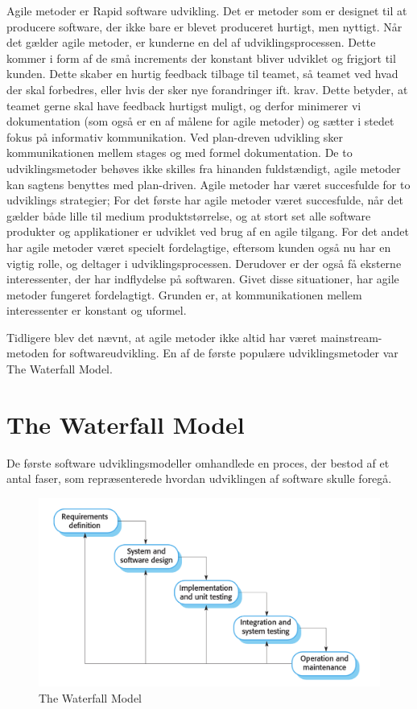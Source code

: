 Agile metoder er Rapid software udvikling. Det er metoder som er designet til at producere software, der ikke bare er blevet produceret hurtigt, men nyttigt\cite{Sommerville}. Når det gælder agile metoder, er kunderne en del af udviklingsprocessen. Dette kommer i form af de små increments der konstant bliver udviklet og frigjort til kunden. Dette skaber en hurtig feedback tilbage til teamet, så teamet ved hvad der skal forbedres, eller hvis der sker nye forandringer ift. krav. Dette betyder, at teamet gerne skal have feedback hurtigst muligt, og derfor minimerer vi dokumentation (som også er en af målene for agile metoder) og sætter i stedet fokus på informativ kommunikation. Ved plan-dreven udvikling sker kommunikationen mellem stages og med formel dokumentation. De to udviklingsmetoder behøves ikke skilles fra hinanden fuldstændigt, agile metoder kan sagtens benyttes med plan-driven. Agile metoder har været succesfulde for to udviklings strategier;
For det første har agile metoder været succesfulde, når det gælder både lille til medium produktstørrelse, og at stort set alle software produkter og applikationer er udviklet ved brug af en agile tilgang.
For det andet har agile metoder været specielt fordelagtige, eftersom kunden også nu har en vigtig rolle, og deltager i udviklingsprocessen. Derudover er der også få eksterne interessenter, der har indflydelse på softwaren\cite{Sommerville}. 
Givet disse situationer, har agile metoder fungeret fordelagtigt. Grunden er, at kommunikationen mellem interessenter er konstant og uformel.

Tidligere blev det nævnt, at agile metoder ikke altid har været mainstream-metoden for softwareudvikling. En af de første populære udviklingsmetoder var The Waterfall Model.

\section{The Waterfall Model}
De første software udviklingsmodeller omhandlede en proces, der bestod af et antal faser, som repræsenterede hvordan udviklingen af software skulle foregå\cite{Sommerville}. 

\begin{figure}
    \includegraphics[width=\linewidth]{figures/waterfall_model.png}
    \caption{The Waterfall Model}
    \label{fig:waterfall}
\end{figure}

